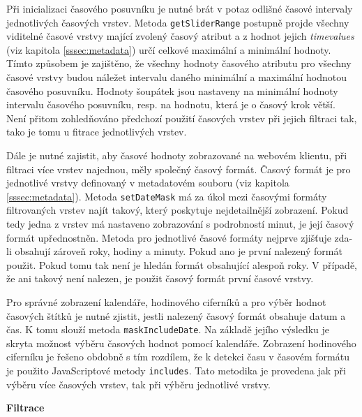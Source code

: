 Při inicializaci časového posuvníku je nutné brát v potaz
odlišné časové intervaly jednotlivých časových vrstev. Metoda
\verb|getSliderRange| postupně projde všechny viditelné
časové vrstvy mající zvolený časový atribut a z hodnot jejich
\textit{time\textunderscore values} (viz kapitola \ref{sssec:metadata}) určí
celkové maximální a minimální hodnoty. Tímto způsobem je zajištěno,
že všechny hodnoty časového atributu pro všechny časové vrstvy budou
náležet intervalu daného minimální a maximální hodnotou časového
posuvníku. Hodnoty šoupátek jsou nastaveny na minimální hodnoty
intervalu časového posuvníku, resp. na hodnotu, která je o časový
krok větší. Není přitom zohledňováno předchozí použití časových
vrstev při jejich filtraci tak, tako je tomu u fitrace jednotlivých vrstev.

Dále je nutné zajistit, aby časové hodnoty zobrazované na webovém
klientu, při filtraci více vrstev najednou, měly společný časový
formát. Časový formát je pro jednotlivé vrstvy definovaný v metadatovém
souboru (viz kapitola \ref{sssec:metadata}). Metoda \verb|setDateMask|
má za úkol mezi časovými formáty filtrovaných vrstev najít takový,
který poskytuje nejdetailnější zobrazení. Pokud tedy jedna z vrstev
má nastaveno zobrazování s podrobností minut, je její časový
formát upřednostněn. Metoda pro jednotlivé časové formáty nejprve
zjišťuje zda-li obsahují zároveň roky, hodiny a minuty. Pokud ano je
první nalezený formát použit. Pokud tomu tak není je hledán formát
obsahující alespoň roky. V případě, že ani takový není nalezen,
je použit časový formát první časové vrstvy.

Pro správné zobrazení kalendáře, hodinového ciferníků a
pro výběr hodnot časových štítků je nutné zjistit, jestli
nalezený časový formát obsahuje datum a čas. K tomu slouží metoda
\verb|maskIncludeDate|. Na základě jejího výsledku je skryta možnost
výběru časových hodnot pomocí kalendáře. Zobrazení hodinového
ciferníku je řešeno obdobně s tím rozdílem, že k detekci času v
časovém formátu je použito JavaScriptové metody \verb|includes|. Tato
metodika je provedena jak při výběru více časových vrstev, tak při
výběru jednotlivé vrstvy.

\bigskip
\noindent \textbf{Filtrace}

